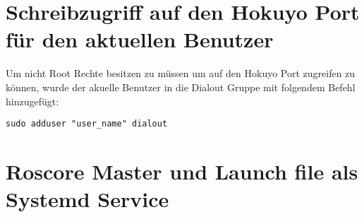 \section{Schreibzugriff auf den Hokuyo Port für den aktuellen Benutzer}
Um nicht Root Rechte besitzen zu müssen um auf den Hokuyo Port zugreifen zu können, wurde der akuelle Benutzer in die Dialout Gruppe mit folgendem Befehl hinzugefügt:

\begin{lstlisting}
sudo adduser "user_name" dialout
\end{lstlisting}

\section{Roscore Master und Launch file als Systemd Service}